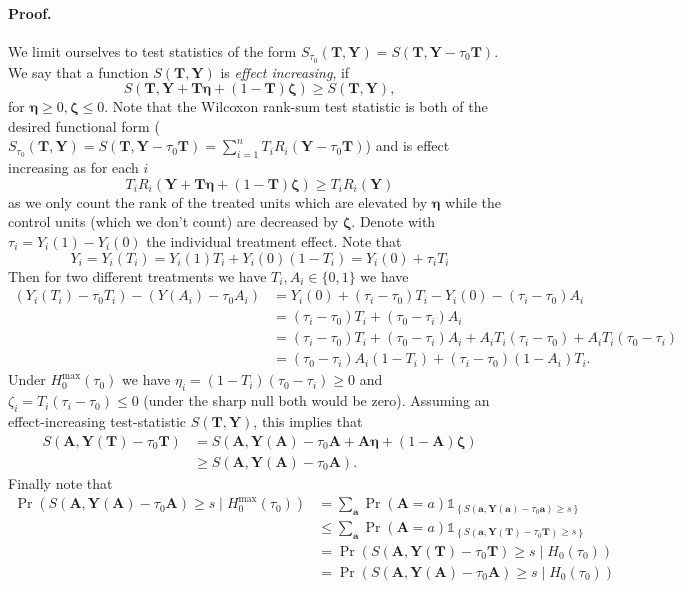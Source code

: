\documentclass[11pt]{exam}
\theoremstyle{plain}
\newcommand{\lt}{\left}
\newcommand{\rt}{\right}
\newcommand{\Ind}[1]{\mathds{1}_{\lt\{ #1 \rt\}}}
\begin{document}
\paragraph{Proof.}
We limit ourselves to test statistics of the form $S_{\tau_0}(\bm{T}, \bm{Y}) = S(\bm{T}, \bm{Y}- \tau_0 \bm{T})$. We say that a function $S(\bm{T}, \bm{Y})$ is \emph{effect increasing}, if
\[
 S(\bm{T}, \bm{Y} + \bm{T} \bm{\eta} + (1 - \bm{T}) \bm{\zeta}) \geq  S(\bm{T}, \bm{Y}),
\]
for $\bm{\eta} \geq 0, \bm{\zeta} \leq 0$. 
Note that the Wilcoxon rank-sum test statistic is both of the desired functional form ($S_{\tau_0}(\bm{T}, \bm{Y}) = S(\bm{T}, \bm{Y}- \tau_0 \bm{T}) = \sum_{i=1}^n T_i R_i(\bm{Y}- \tau_0 \bm{T})$) and is effect increasing as for each $i$
\[  
    T_i R_i(\bm{Y} + \bm{T} \bm{\eta} + (1 - \bm{T}) \bm{\zeta}) \geq T_i R_i(\bm{Y})
\]
as we only count the rank of the treated units which are elevated by $\bm{\eta}$ while the control units (which we don't count) are decreased by $\bm{\zeta}$. 
Denote with $\tau_i = Y_i(1) - Y_i(0)$ the individual treatment effect. Note that 
\[
Y_i = Y_i(T_i) = Y_i(1) T_i + Y_i(0) (1-T_i) = Y_i(0) + \tau_i T_i
\]
Then for two different treatments we have $T_i, A_i \in \{0, 1\}$ we have
\begin{align*}
    (Y_i(T_i) - \tau_0 T_i) - (Y(A_i) - \tau_0 A_i) &= Y_i(0) + (\tau_i - \tau_0) T_i - Y_i(0) - (\tau_i - \tau_0) A_i
    \\
    &= (\tau_i - \tau_0) T_i + (\tau_0 - \tau_i) A_i
    \\
    &= (\tau_i - \tau_0) T_i + (\tau_0 - \tau_i) A_i + A_i T_i (\tau_i - \tau_0) + A_i T_i (\tau_0 - \tau_i)
    \\
    &= (\tau_0 - \tau_i) A_i (1 - T_i) + (\tau_i - \tau_0) (1 - A_i) T_i.
\end{align*}
Under $H^{\max}_0(\tau_0)$ we have $\eta_i = (1 - T_i) (\tau_0 - \tau_i) \geq 0$ and $\zeta_i = T_i (\tau_i - \tau_0) \leq 0$ (under the sharp null both would be zero). Assuming an effect-increasing test-statistic $S(\bm{T}, \bm{Y})$, this implies that
\begin{align*}
S(\bm{A}, \bm{Y}(\bm{T}) - \tau_0 \bm{T}) &= S(\bm{A}, \bm{Y}(\bm{A}) - \tau_0 \bm{A} + \bm{A} \bm{\eta} + (1 - \bm{A}) \bm{\zeta} )
\\
&\geq S(\bm{A}, \bm{Y}(\bm{A}) - \tau_0 \bm{A}).
\end{align*}
Finally note that
\begin{align*}
    \Pr(S(\bm{A}, \bm{Y}(\bm{A}) - \tau_0 \bm{A}) \geq s \mid H^{\max}_0(\tau_0)) &= \sum_{\bm{a}} \Pr(\bm{A} = a) \Ind{S(\bm{a}, \bm{Y}(\bm{a}) - \tau_0 \bm{a}) \geq s}
    \\
    &\leq \sum_{\bm{a}} \Pr(\bm{A} = a) \Ind{S(\bm{a}, \bm{Y}(\bm{T}) - \tau_0 \bm{T}) \geq s}
    \\
    &= \Pr(S(\bm{A}, \bm{Y}(\bm{T}) - \tau_0 \bm{T}) \geq s \mid H_0(\tau_0))
    \\
    &= \Pr(S(\bm{A}, \bm{Y}(\bm{A}) - \tau_0 \bm{A}) \geq s \mid H_0(\tau_0))
\end{align*}
\end{document}
